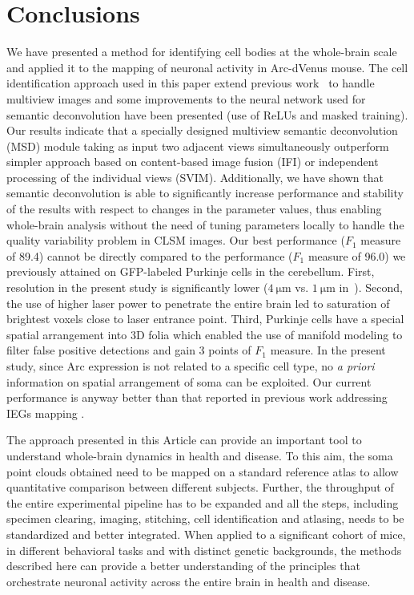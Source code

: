 \documentclass[smallextended]{svjour3}       %
\begin{document}
\section{Conclusions}
We have presented a method for identifying cell bodies at the
whole-brain scale and applied it to the mapping of neuronal activity
in Arc-dVenus mouse. The cell identification approach used in this
paper extend previous work~\cite{frasconi_large-scale_2014} to handle
multiview images and some improvements to the neural network used for
semantic deconvolution have been presented (use of ReLUs and
masked training). Our results indicate that a specially designed multiview
semantic deconvolution (MSD) module taking as input two adjacent views
simultaneously outperform simpler approach based on content-based
image fusion (IFI) or independent processing of the individual views
(SVIM). Additionally, we have shown that semantic deconvolution is
able to significantly increase performance and stability of the
results with respect to changes in the parameter values, thus enabling
whole-brain analysis without the need of tuning parameters locally to
handle the quality variability problem in CLSM images. Our best
performance ($F_1$ measure of 89.4) cannot be directly compared to the
performance ($F_1$ measure of 96.0) we previously attained on
GFP-labeled Purkinje cells in the cerebellum. First, resolution in the
present study is significantly lower ($\SI{4}{\micro\meter}$
vs. $\SI{1}{\micro\meter}$
in~\cite{frasconi_large-scale_2014}). Second, the use of higher laser power
to penetrate the entire brain led to saturation of brightest voxels close to laser
entrance point.
Third, Purkinje cells have a special spatial arrangement
into 3D folia which enabled the use of manifold modeling to filter
false positive detections and gain 3 points of $F_1$ measure. In the present study,
since Arc expression is not related to a specific cell type, no \emph{a priori}
information on spatial arrangement of soma can be exploited. Our current performance
is anyway better than that reported in previous work addressing IEGs mapping \cite{kim_mapping_2015}.

The approach presented in this Article can provide an important tool to
understand whole-brain dynamics in health and disease. To this aim, the soma
point clouds obtained need to be mapped on a standard reference atlas
to allow quantitative comparison between different subjects. Further, the throughput of the entire
experimental pipeline has to be expanded and all the steps, including specimen clearing, imaging, stitching, cell identification
and atlasing, needs to be standardized and better integrated.
When applied to a significant cohort of mice, in different behavioral tasks and with
distinct genetic backgrounds, the methods described here can provide a better understanding
of the principles that orchestrate
neuronal activity across the entire brain in health and disease.
\end{document}

